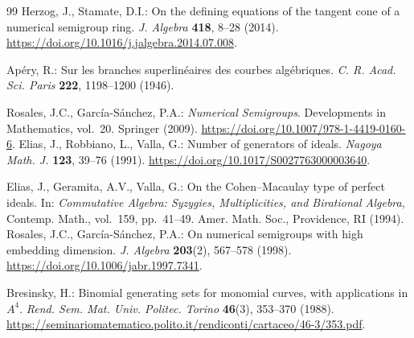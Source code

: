 \documentclass[11pt]{article}
\theoremstyle{definition}
\theoremstyle{remark}
\theoremstyle{plain}
\begin{document}
\begin{thebibliography}{99}
Herzog, J., Stamate, D.I.: On the defining equations of the tangent cone of
a numerical semigroup ring. \emph{J. Algebra} \textbf{418}, 8--28 (2014).
\url{https://doi.org/10.1016/j.jalgebra.2014.07.008}.

Ap\'ery, R.: Sur les branches superlin\'eaires des courbes alg\'ebriques.
\emph{C. R. Acad. Sci. Paris} \textbf{222}, 1198--1200 (1946).

Rosales, J.C., Garc\'ia-S\'anchez, P.A.: \emph{Numerical Semigroups}.
Developments in Mathematics, vol.~20. Springer (2009).
\url{https://doi.org/10.1007/978-1-4419-0160-6}.
Elias, J., Robbiano, L., Valla, G.: Number of generators of ideals.
\emph{Nagoya Math. J.} \textbf{123}, 39--76 (1991).
\url{https://doi.org/10.1017/S0027763000003640}.

Elias, J., Geramita, A.V., Valla, G.: On the Cohen--Macaulay type of perfect
ideals. In: \emph{Commutative Algebra: Syzygies, Multiplicities, and
Birational Algebra}, Contemp. Math., vol.~159, pp.~41--49. Amer. Math.
Soc., Providence, RI (1994).
Rosales, J.C., Garc\'ia-S\'anchez, P.A.: On numerical semigroups with high
embedding dimension. \emph{J. Algebra} \textbf{203}(2), 567--578 (1998).
\url{https://doi.org/10.1006/jabr.1997.7341}.

Bresinsky, H.: Binomial generating sets for monomial curves, with
applications in $A^4$. \emph{Rend. Sem. Mat. Univ. Politec. Torino}
\textbf{46}(3), 353--370 (1988).
\url{https://seminariomatematico.polito.it/rendiconti/cartaceo/46-3/353.pdf}.
\end{thebibliography}
\end{document}
